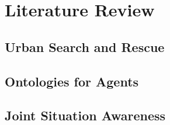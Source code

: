 \section{Literature Review}
\subsection{Urban Search and Rescue}
\subsection{Ontologies for Agents}
\subsection{Joint Situation Awareness}

  